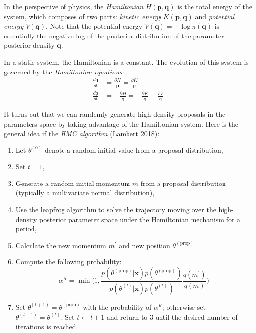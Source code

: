 \documentclass[12pt]{book}
\numberwithin{equation}{chapter}
\providecommand{\tightlist}{%
  \setlength{\itemsep}{0pt}\setlength{\parskip}{0pt}}
\begin{document}
In the perspective of physics, the \emph{Hamiltonian} \(H(\boldsymbol{p}, \boldsymbol{q})\) is the total energy of the system, which composes of two parts: \emph{kinetic energy} \(K(\boldsymbol{p}, \boldsymbol{q})\) and \emph{potential energy} \(V(\boldsymbol{q})\). Note that the potential energy \(V(\boldsymbol{q}) = -\log\pi(\boldsymbol{q})\) is essentially the negative log of the posterior distribution of the parameter posterior density \(\boldsymbol{q}\).

In a static system, the Hamiltonian is a constant. The evolution of this system is governed by the \emph{Hamiltonian equations}:
\begin{equation}
\begin{aligned}
\frac{d \boldsymbol{q}}{dt} &= \frac{\partial H}{\boldsymbol{p}} = \frac{\partial K}{\boldsymbol{p}}\\
\frac{d \boldsymbol{p}}{dt} &= -\frac{\partial H}{\boldsymbol{q}} = -\frac{\partial K}{\boldsymbol{q}} - \frac{\partial V}{\boldsymbol{q}}
\label{eq:hamiltonianequation}
\end{aligned}
\end{equation}

It turns out that we can randomly generate high density proposals in the parameters space by taking advantage of the Hamiltonian system. Here is the general idea if the \emph{HMC algorithm} (Lambert \protect\hyperlink{ref-lambert2018student}{2018}):

\begin{enumerate}
\def\labelenumi{\arabic{enumi}.}
\tightlist
\item
  Let \(\theta^{(0)}\) denote a random initial value from a proposal distribution,
\item
  Set \(t = 1\),
\item
  Generate a random initial momentum \(m\) from a proposal distribution (typically a multivariate normal distribution),
\item
  Use the leapfrog algorithm to solve the trajectory moving over the high-density posterior parameter space under the Hamiltonian mechanism for a period,
\item
  Calculate the new momentum \(m^\prime\) and new position \(\theta^{(\text{prop})}\)
\item
  Compute the following probability:
  \begin{equation}
  \alpha^H = \min\bigg(1, \frac{p\left(\theta^{(\text{prop})} | \boldsymbol{x}\right)p(\theta^{(\text{prop})})}{p\left(\theta^{(t)} | \boldsymbol{x}\right)p(\theta^{(t)})} \frac{q(m^\prime)}{q(m)}\bigg)
  \label{eq:hmc}
  \end{equation}
\item
  Set \(\theta^{(t+1)} = \theta^{(\text{prop})}\) with the probability of \(\alpha^H\); otherwise set \(\theta^{(t+1)} = \theta^{(t)}\). Set \(t \leftarrow t + 1\) and return to 3 until the desired number of iterations is reached.
\end{enumerate}
\end{document}

